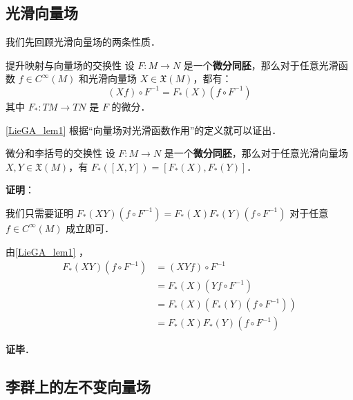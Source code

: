 

\subsection{光滑向量场}


我们先回顾光滑向量场的两条性质．

\begin{lemma}{提升映射与向量场的交换性}\label{LieGA_lem1}
设 $F:M\to N$ 是一个\textbf{微分同胚}，那么对于任意光滑函数 $f\in C^{\infty}(M)$ 和光滑向量场 $X\in\mathfrak{X}(M)$，都有：
\begin{equation}\label{LieGA_eq1}
(Xf)\circ F^{-1}=F_*(X)(f\circ F^{-1})
\end{equation}
其中 $F_*:TM\to TN$ 是 $F$ 的微分．
\end{lemma}

\autoref{LieGA_lem1} 根据“向量场对光滑函数作用”的定义就可以证出．


\begin{lemma}{微分和李括号的交换性}\label{LieGA_lem2}
设 $F:M\to N$ 是一个\textbf{微分同胚}，那么对于任意光滑向量场 $X, Y\in\mathfrak{X}(M)$，有 $F_*([X, Y])=[F_*(X), F_*(Y)]$．
\end{lemma}

\textbf{证明}：

我们只需要证明 $F_*(XY)(f\circ F^{-1})=F_*(X)F_*(Y)(f\circ F^{-1})$ 对于任意 $f\in C^{\infty}(M)$ 成立即可．

由\autoref{LieGA_lem1} ，
\begin{equation}
\begin{aligned}
F_*(XY)(f\circ F^{-1})&=(XYf)\circ F^{-1}\\
&=F_*(X)(Yf\circ F^{-1})\\
&=F_*(X)(F_*(Y)(f\circ F^{-1}))\\
&=F_*(X)F_*(Y)(f\circ F^{-1})
\end{aligned}
\end{equation}

\textbf{证毕}．

\subsection{李群上的左不变向量场}

